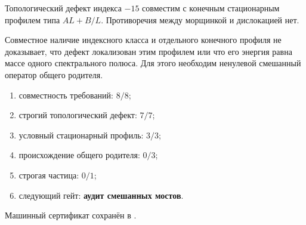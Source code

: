 \begin{theorem}
Топологический дефект индекса $-15$ совместим с конечным стационарным
профилем типа $AL+B/L$. Противоречия между морщинкой и дислокацией нет.
\end{theorem}
\begin{nogocriterion}
Совместное наличие индексного класса и отдельного конечного профиля не
доказывает, что дефект локализован этим профилем или что его энергия равна
массе одного спектрального полюса. Для этого необходим ненулевой смешанный
оператор общего родителя.
\end{nogocriterion}
\begin{protocol}\begin{enumerate}
\item совместность требований: \textbf{$8/8$};
\item строгий топологический дефект: \textbf{$7/7$};
\item условный стационарный профиль: \textbf{$3/3$};
\item происхождение общего родителя: \textbf{$0/3$};
\item строгая частица: \textbf{$0/1$};
\item следующий гейт: \textbf{аудит смешанных мостов}.
\end{enumerate}\end{protocol}
Машинный сертификат сохранён в
.